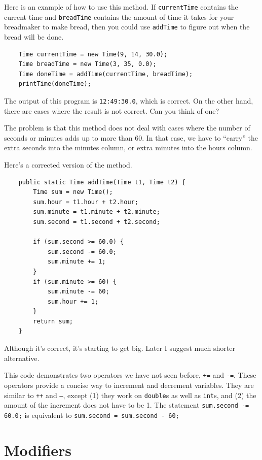 Here is an example of how to use this method.  If {\tt currentTime}
contains the current time and {\tt breadTime} contains the amount
of time it takes for your breadmaker to make bread, then you
could use {\tt addTime} to figure out when the bread will be
done.

\begin{lstlisting}
    Time currentTime = new Time(9, 14, 30.0);
    Time breadTime = new Time(3, 35, 0.0);
    Time doneTime = addTime(currentTime, breadTime);
    printTime(doneTime);
\end{lstlisting}
%
The output of this program is {\tt 12:49:30.0}, which is
correct.  On the other hand, there are cases where the result
is not correct.  Can you think of one?

The problem is that this method does not deal with cases
where the number of seconds or minutes adds up to more than
60.  In that case, we have to ``carry'' the extra seconds
into the minutes column, or extra minutes into the hours
column.

Here's a corrected version of the method.

\begin{lstlisting}
    public static Time addTime(Time t1, Time t2) {
        Time sum = new Time();
        sum.hour = t1.hour + t2.hour;
        sum.minute = t1.minute + t2.minute;
        sum.second = t1.second + t2.second;

        if (sum.second >= 60.0) {
            sum.second -= 60.0;
            sum.minute += 1;
        }
        if (sum.minute >= 60) {
            sum.minute -= 60;
            sum.hour += 1;
        }
        return sum;
    }
\end{lstlisting}
%
Although it's correct, it's starting to get big.  Later
I suggest much shorter alternative.


This code demonstrates two operators we have not seen before,
{\tt +=} and {\tt -=}.  These operators provide a concise
way to increment and decrement variables.  They are similar
to {\tt ++} and {\tt --}, except (1) they work on {\tt double}s
as well as {\tt int}s, and (2) the amount of the increment
does not have to be 1.  The statement {\tt sum.second -= 60.0;}
is equivalent to {\tt sum.second = sum.second - 60;}


\section{Modifiers}

